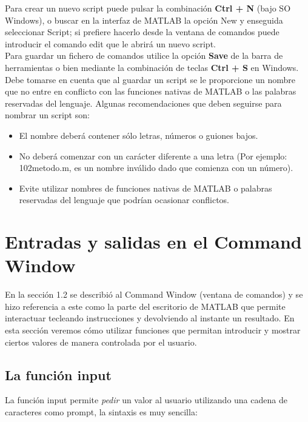 Para crear un nuevo script puede pulsar la combinación \textbf{Ctrl + N} (bajo SO Windows), o buscar 
en la interfaz de MATLAB la opción New y enseguida seleccionar Script; si prefiere hacerlo 
desde la ventana de comandos puede introducir el comando edit que le abrirá un nuevo script.\\

Para guardar un fichero de comandos utilice la opción \textbf{Save} de la barra de herramientas  o 
bien mediante la combinación de teclas \textbf{Ctrl + S} en Windows. Debe tomarse en cuenta que 
al guardar un script se le proporcione un nombre que no entre en conflicto con las funciones 
nativas de MATLAB o las palabras reservadas del lenguaje. Algunas recomendaciones que deben 
seguirse para nombrar un script son:

\begin{itemize}
\item El nombre deberá contener sólo letras, números o guiones bajos.
\item No deberá comenzar con un carácter diferente a una letra (Por ejemplo: 102metodo.m, es un nombre inválido dado que comienza con un número).
\item Evite utilizar nombres de funciones nativas de MATLAB o palabras reservadas del lenguaje que podrían ocasionar conflictos.
\end{itemize}






\section{Entradas y salidas en el Command Window}

En la sección 1.2 se describió al Command Window (ventana de comandos) y se hizo referencia a este 
como la parte del escritorio de MATLAB que permite interactuar tecleando instrucciones y 
devolviendo al instante un resultado. En esta sección veremos cómo utilizar funciones que 
permitan introducir y mostrar ciertos valores de manera controlada por el usuario.

\subsection{La función input}

La función input permite \textit{pedir} un valor al usuario utilizando una cadena de caracteres 
como prompt, la sintaxis es muy sencilla:

